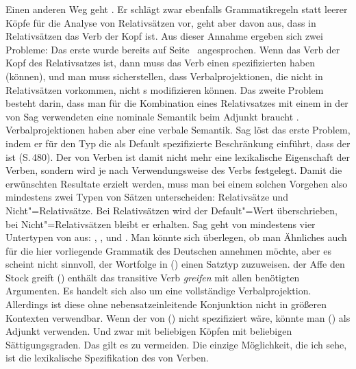 Einen anderen Weg geht \citet{Sag97a}. Er schlägt zwar ebenfalls Grammatikregeln statt leerer Köpfe
für die Analyse von Relativsätzen vor, geht aber davon aus, dass in Relativsätzen das Verb der Kopf
ist. Aus dieser Annahme ergeben sich zwei Probleme: Das erste wurde bereits auf
Seite~\pageref{Erklaerung-relativizer} angesprochen. Wenn das Verb der Kopf des Relativsatzes ist,
dann muss das Verb einen spezifizierten \modw haben (können), und man muss sicherstellen, dass
Verbalprojektionen, die nicht in Relativsätzen vorkommen, nicht \nbar{}s modifizieren können. Das
zweite Problem besteht darin, dass man für die Kombination eines Relativsatzes mit einem \nbar in
der von Sag verwendeten  eine nominale Semantik beim Adjunkt
braucht \parencites[Abschnitt~1.9, 213]{ps2}. Verbalprojektionen haben aber eine verbale Semantik. Sag löst das erste 
Problem, indem er für den Typ  die als Default spezifizierte Beschränkung
einführt, dass der \modw {} ist (S.\,480). Der \modw von Verben ist damit nicht mehr eine
lexikalische Eigenschaft der Verben, sondern wird je nach Verwendungsweise des Verbs
festgelegt. Damit die erwünschten Resultate erzielt werden, muss man bei einem solchen Vorgehen also
mindestens zwei Typen von Sätzen unterscheiden: Relativsätze und Nicht"=Relativsätze. Bei
Relativsätzen wird der Default"=Wert überschrieben, bei Nicht"=Relativsätzen bleibt er erhalten. Sag geht von
mindestens vier Untertypen von  aus: , ,  und
. Man könnte sich überlegen, ob man Ähnliches auch für die hier vorliegende Grammatik
des Deutschen annehmen möchte, aber es scheint nicht sinnvoll, der Wortfolge in () einen
Satztyp zuzuweisen.
\ea
der Affe den Stock greift
\z
() enthält das transitive Verb \emph{greifen} mit allen benötigten Argumenten. Es handelt
sich also um eine vollständige Verbalprojektion. Allerdings ist diese ohne nebensatzeinleitende
Konjunktion nicht in größeren Kontexten verwendbar. Wenn der \modw von () nicht spezifiziert
wäre, könnte man () als Adjunkt verwenden. Und zwar mit beliebigen Köpfen mit beliebigen
Sättigungsgraden. Das gilt es zu vermeiden. Die einzige Möglichkeit, die ich sehe, ist die
lexikalische Spezifikation des \modwes von Verben.
